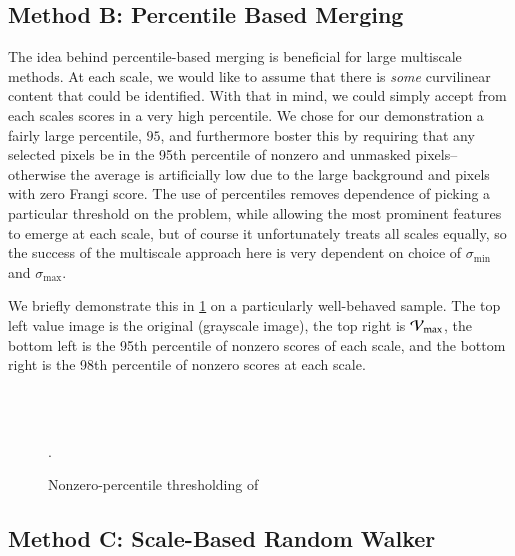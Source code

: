 \subsection{Method B: Percentile Based Merging}

The idea behind percentile-based merging is beneficial for large multiscale methods. At each scale, we would like to assume that there is \textit{some} curvilinear content that could be identified. With that in mind, we could simply accept from each scales scores in a very high percentile. We chose for our demonstration a fairly large percentile, $95$, and furthermore boster this by requiring that any selected pixels be in the 95th percentile of nonzero and unmasked pixels--otherwise the average is artificially low due to the large background and pixels with zero Frangi score. The use of percentiles removes dependence of picking a particular threshold on the problem, while allowing the most prominent features to emerge at each scale, but of course it unfortunately treats all scales equally, so the success of the multiscale approach here is very dependent on choice of $\sigma_{\min}$ and $\sigma_{\max}$.

	We briefly demonstrate this in \cref{fig:qthresh_demo} on a particularly well-behaved sample. The top left value image is the original (grayscale image), the top right is $\mathcal{V}_{\max}$, the bottom left is the 95th percentile of nonzero scores of each scale, and the bottom right is the 98th percentile of nonzero scores at each scale.

\begin{figure} \centering
   \;
   \\
   \;
   \\
  \caption{Nonzero-percentile thresholding of \Vmax}.
  \label{fig:qthresh_demo}
\end{figure}

\subsection{Method C: Scale-Based Random Walker}

